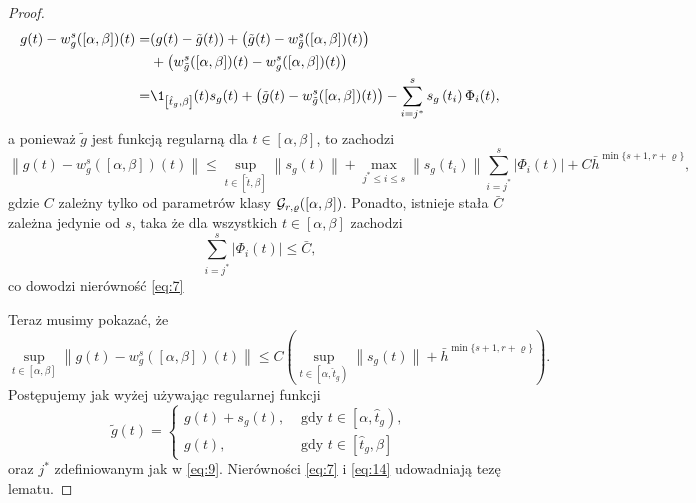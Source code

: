 \documentclass[oik, pdftex, man]{mgrwms}
\begin{document}
\begin{proof}
\begin{equation*}
            \begin{aligned}
                g(t)-w_{g}^{s}([\alpha, \beta])(t)=&(g(t)-\tilde{g}(t))+\left(\tilde{g}(t)-w_{\tilde{g}}^{s}([\alpha, \beta])(t)\right) \\
                &+\left(w_{\tilde{g}}^{s}([\alpha, \beta])(t)-w_{g}^{s}([\alpha, \beta])(t)\right) \\
                =& \1_{\left[\hat{t}_{g}, \beta\right]}(t) s_{g}(t)+\left(\tilde{g}(t)-w_{\tilde{g}}^{s}([\alpha, \beta])(t)\right)-\sum_{i=j^{*}}^{s} s_{g}\left(t_{i}\right) \Phi_{i}(t),
            \end{aligned}
        \end{equation*}
        a ponieważ $\tilde{g}$ jest funkcją regularną dla $t \in[\alpha, \beta]$, to zachodzi
        \begin{equation*}
            \left\|g(t)-w_{g}^{s}([\alpha, \beta])(t)\right\| \leq 
                \sup _{t \in[\hat{t}, \beta]}\left\|s_{g}(t)\right\|+\max _{j^{*} \leq i \leq s}\left\|s_{g}\left(t_{i}\right)\right\| \sum_{i=j^{*}}^{s}\left|\Phi_{i}(t)\right|+C \bar{h}^{\min \{s+1, r+\varrho\}},
        \end{equation*}
        gdzie $C$ zależny tylko od parametrów klasy $\mathcal{G}_{r,\varrho}([\alpha,\beta])$. Ponadto, istnieje stała $\bar{C}$ zależna jedynie od $s$, taka że dla wszystkich $t \in[\alpha, \beta]$ zachodzi
        \begin{equation} \label{eq:13}
            \sum_{i=j^{*}}^{s}\left|\Phi_{i}(t)\right| \leq \bar{C},
        \end{equation}
        co dowodzi nierówność \eqref{eq:7}

        Teraz musimy pokazać, że
        \begin{equation} \label{eq:14}
            \sup _{t \in[\alpha, \beta]}\left\|g(t)-w_{g}^{s}([\alpha, \beta])(t)\right\| \leq C\left(\sup _{t \in\left[\alpha, \hat{t}_{g}\right)}\left\|s_{g}(t)\right\|+\bar{h}^{\min \{s+1, r+\varrho\}}\right).
        \end{equation}
        Postępujemy jak wyżej używając regularnej funkcji
        \begin{equation} \label{eq:15:tilde_g_z_plusem}
            \tilde{g}(t)= \begin{cases}
                g(t)+s_{g}(t),    & \text { gdy } t \in\left[\alpha, \hat{t}_{g}\right), \\ 
                g(t),             & \text { gdy } t \in\left[\hat{t}_{g}, \beta\right]
            \end{cases}
        \end{equation}
        oraz $j^{*}$ zdefiniowanym jak w \eqref{eq:9}.
        Nierówności \eqref{eq:7} i \eqref{eq:14} udowadniają tezę lematu.
    \end{proof}
\end{document}
